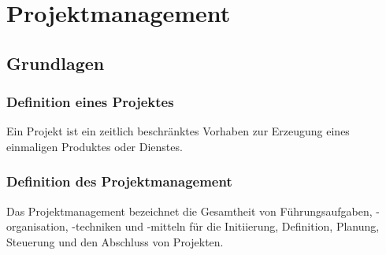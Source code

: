 \section{Projektmanagement}
\subsection{Grundlagen}

\subsubsection{Definition eines Projektes}
Ein Projekt ist ein zeitlich beschränktes Vorhaben zur Erzeugung eines einmaligen Produktes oder Dienstes. 

\subsubsection{Definition des Projektmanagement}
Das Projektmanagement bezeichnet die Gesamtheit von Führungsaufgaben, -organisation, -techniken und -mitteln für die Initiierung, Definition, Planung, Steuerung und den Abschluss von Projekten. 


